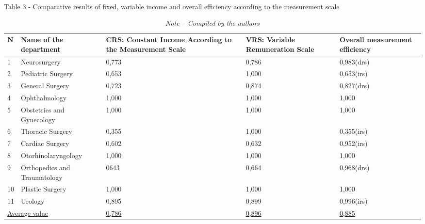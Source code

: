 \begin{table}[H]
\caption*{Table 3 - Comparative results of fixed, variable income and overall efficiency according to the measurement scale}
\centering
\begin{tabular}{|l|l|p{}|p{}|p{}|} 
\hline
N & Name of the department & CRS: Constant Income According to the Measurement Scale & VRS: Variable Remuneration Scale & Overall measurement efficiency \\ 
\hline
1 & Neurosurgery & 0,773 & 0,786 & 0,983(drs) \\ 
\hline
2 & Pediatric Surgery & 0,653 & 1,000 & 0,653(irs) \\ 
\hline
3 & General Surgery & 0,723 & 0,874 & 0,827(drs) \\ 
\hline
4 & Ophthalmology & 1,000 & 1,000 & 1,000 \\ 
\hline
5 & Obstetrics and Gynecology & 1,000 & 1,000 & 1,000 \\ 
\hline
6 & Thoracic Surgery & 0,355 & 1,000 & 0,355(irs) \\ 
\hline
7 & Cardiac Surgery & 0,602 & 0,632 & 0,952(irs) \\ 
\hline
8 & Otorhinolaryngology & 1,000 & 1,000 & 1,000 \\ 
\hline
9 & Orthopedics and Traumatology & 0643 & 0,664 & 0,968(drs) \\ 
\hline
10 & Plastic Surgery & 1,000 & 1,000 & 1,000 \\ 
\hline
11 & Urology & 0,895 & 0,899 & 0,996(irs) \\ 
\hline
\multicolumn{2}{|l|}{\uline{Average value}} & \uline{0,786} & \uline{0,896} & \uline{0,885} \\
\hline
\end{tabular}
\caption*{\normalfont\emph{Note -- Compiled by the authors}}
\end{table}

